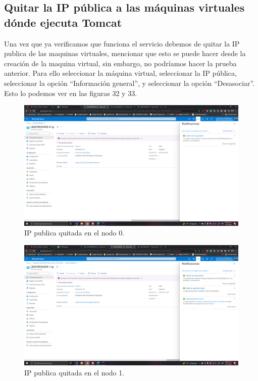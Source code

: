 \documentclass[11pt]{article}
\begin{document}
		\subsection{Quitar la IP pública a las máquinas virtuales dónde ejecuta Tomcat}
		Una vez que ya verificamos que funciona el servicio debemos de quitar la IP publica de las maquinas virtuales, mencionar que esto se puede hacer desde la creación de la maquina virtual, sin embargo, no podríamos hacer la prueba anterior. Para ello seleccionar la máquina virtual, seleccionar la IP pública, seleccionar la opción ``Información general'', y seleccionar la opción ``Desasociar''. Esto lo podemos ver en las figuras 32 y 33.	
		\begin{figure}[H]
			\centering
			\includegraphics[scale=0.34]{resources/tp6N0.png}
			\caption{IP publica quitada en el nodo 0.}\label{fig:picture}
		\end{figure}
		\begin{figure}[H]
			\centering
			\includegraphics[scale=0.34]{resources/tp6N1.png}
			\caption{IP publica quitada en el nodo 1.}\label{fig:picture}
		\end{figure}
\end{document}
